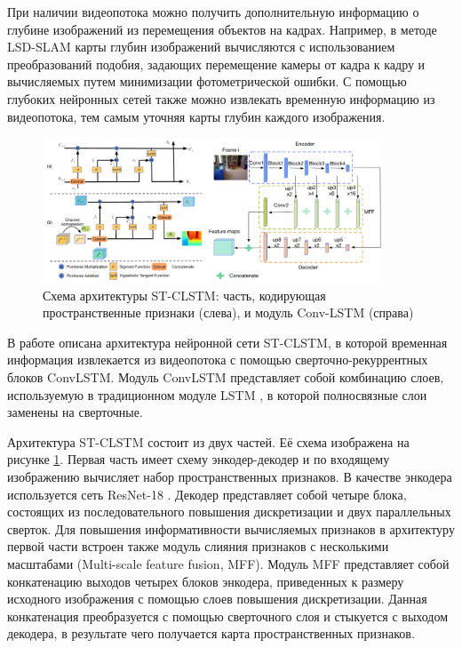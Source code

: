 \documentclass{mipt-thesis-ms}
\begin{document}
	При наличии видеопотока можно получить дополнительную информацию о глубине изображений из перемещения объектов на кадрах. Например, в методе LSD-SLAM \cite{engel2014lsd} карты глубин изображений вычисляются с использованием преобразований подобия, задающих перемещение камеры от кадра к кадру и вычисляемых путем минимизации фотометрической ошибки. С помощью глубоких нейронных сетей также можно извлекать временную информацию из видеопотока, тем самым уточняя карты глубин каждого изображения.
	
	\begin{figure}
		\centering
		\includegraphics[width=0.9\textwidth]{img/st_clstm_scheme.png}
		\caption{Схема архитектуры ST-CLSTM: часть, кодирующая пространственные признаки (слева), и модуль Conv-LSTM (справа)}
		\label{figure_conv_lstm}
	\end{figure}
	
	В работе \cite{zhang2019exploiting} описана архитектура нейронной сети ST-CLSTM, в которой временная информация извлекается из видеопотока с помощью сверточно-рекуррентных блоков ConvLSTM. Модуль ConvLSTM представляет собой комбинацию слоев, используемую в традиционном модуле LSTM \cite{greff2016lstm}, в которой полносвязные слои заменены на сверточные.
	
	Архитектура ST-CLSTM состоит из двух частей. Её схема изображена на рисунке \ref{figure_conv_lstm}. Первая часть имеет схему энкодер-декодер и по входящему изображению вычисляет набор пространственных признаков. В качестве энкодера используется сеть ResNet-18 \cite{he2016deep}. Декодер представляет собой четыре блока, состоящих из последовательного повышения дискретизации и двух параллельных сверток. Для повышения информативности вычисляемых признаков в архитектуру первой части встроен также модуль слияния признаков с несколькими масштабами (Multi-scale feature fusion, MFF). Модуль MFF представляет собой конкатенацию выходов четырех блоков энкодера, приведенных к размеру исходного изображения с помощью слоев повышения дискретизации. Данная конкатенация преобразуется с помощью сверточного слоя и стыкуется с выходом декодера, в результате чего получается карта пространственных признаков.
	
\end{document}
